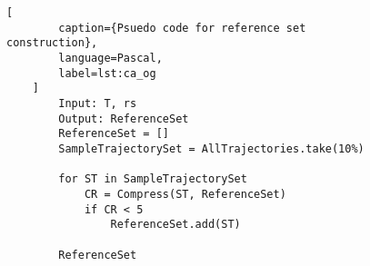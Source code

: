 \begin{figure}[t]
    \begin{lstlisting}[
        caption={Psuedo code for reference set construction},
        language=Pascal,
        label=lst:ca_og
    ]
        Input: T, rs
        Output: ReferenceSet
        ReferenceSet = []
        SampleTrajectorySet = AllTrajectories.take(10%)

        for ST in SampleTrajectorySet
            CR = Compress(ST, ReferenceSet)
            if CR < 5 
                ReferenceSet.add(ST)

        ReferenceSet
    \end{lstlisting}
\end{figure}